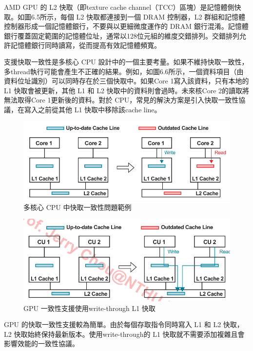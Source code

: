 \vspace{1em}
AMD GPU 的 L2 快取（即texture cache channel（TCC）區塊）是記憶體側快取。如圖6.5所示，每個 L2 快取都連接到一個 DRAM 控制器，L2 群組和記憶體控制器形成一個記憶體銀行，不要與以更細微度運作的 DRAM 銀行混淆。記憶體銀行覆蓋固定範圍的記憶體位址，通常以128位元組的維度交錯排列。交錯排列允許記憶體銀行同時讀寫，從而提高有效記憶體頻寬。


\vspace{1em}
支援快取一致性是多核心 CPU 設計中的一個主要考量。如果不維持快取一致性，多thread執行可能會產生不正確的結果。例如，如圖6.6所示，一個資料項目（由資料位址識別）可以同時存在於三個快取中。如果Core 1寫入該資料，只有本地的 L1 快取會被更新，其他 L1 和 L2 快取中的資料則會過時。未來核Core 2的讀取將無法取得Core 1更新後的資料。對於 CPU，常見的解決方案是引入快取一致性協議，在寫入之前從其他 L1 快取中移除該cache line。

\begin{figure}
    \centering
    \includegraphics[width=1\linewidth]{FileAusiliari//Screenshots/Figure6-6.png}
    \caption{多核心 CPU 中快取一致性問題範例}
    \label{fig:enter-label}
\end{figure}
\begin{figure}
    \centering
    \includegraphics[width=1\linewidth]{FileAusiliari//Screenshots/Figure6-7.png}
    \caption{GPU 一致性支援使用write-through L1 快取}
    \label{fig:enter-label}
\end{figure}


\vspace{1em}
GPU 的快取一致性支援較為簡單。由於每個存取指令同時寫入 L1 和 L2 快取，L2 快取始終保持最新版本。使用write-through的 L1 快取就不需要添加複雜且會影響效能的一致性協議。

